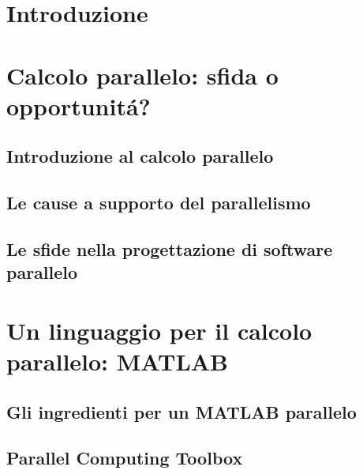 \documentclass[
	a4paper,
	twoside,
	12pt
]{book}
\begin{document}
\frontmatter

\tableofcontents
\mainmatter
\chapter*{Introduzione}

\chapter{Calcolo parallelo: sfida o opportunit\'a?}
\label{cap1}

\section{Introduzione al calcolo parallelo}
\label{par1.1}

\section{Le cause a supporto del parallelismo}
\label{par1.2}

\section{Le sfide nella progettazione di software parallelo}
\label{par1.3}

\chapter{Un linguaggio per il calcolo parallelo: MATLAB}
\label{cap2}

\section{Gli ingredienti per un MATLAB parallelo}
\label{par2.1}

\section{Parallel Computing Toolbox}
\label{par2.2}

\end{document}
